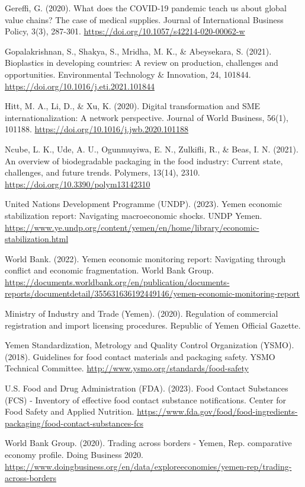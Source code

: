 \documentclass[12pt,a4paper]{article}
\begin{document}
Gereffi, G. (2020). What does the COVID-19 pandemic teach us about global value chains? The case of medical supplies. Journal of International Business Policy, 3(3), 287-301. \url{https://doi.org/10.1057/s42214-020-00062-w}

Gopalakrishnan, S., Shakya, S., Mridha, M. K., \& Abeysekara, S. (2021). Bioplastics in developing countries: A review on production, challenges and opportunities. Environmental Technology \& Innovation, 24, 101844. \url{https://doi.org/10.1016/j.eti.2021.101844}

Hitt, M. A., Li, D., \& Xu, K. (2020). Digital transformation and SME internationalization: A network perspective. Journal of World Business, 56(1), 101188. \url{https://doi.org/10.1016/j.jwb.2020.101188}

Ncube, L. K., Ude, A. U., Ogunmuyiwa, E. N., Zulkifli, R., \& Beas, I. N. (2021). An overview of biodegradable packaging in the food industry: Current state, challenges, and future trends. Polymers, 13(14), 2310. \url{https://doi.org/10.3390/polym13142310}

United Nations Development Programme (UNDP). (2023). Yemen economic stabilization report: Navigating macroeconomic shocks. UNDP Yemen. \url{https://www.ye.undp.org/content/yemen/en/home/library/economic-stabilization.html}

World Bank. (2022). Yemen economic monitoring report: Navigating through conflict and economic fragmentation. World Bank Group. \url{https://documents.worldbank.org/en/publication/documents-reports/documentdetail/355631636192449146/yemen-economic-monitoring-report}

Ministry of Industry and Trade (Yemen). (2020). Regulation of commercial registration and import licensing procedures. Republic of Yemen Official Gazette.

Yemen Standardization, Metrology and Quality Control Organization (YSMO). (2018). Guidelines for food contact materials and packaging safety. YSMO Technical Committee. \url{http://www.ysmo.org/standards/food-safety}

U.S. Food and Drug Administration (FDA). (2023). Food Contact Substances (FCS) - Inventory of effective food contact substance notifications. Center for Food Safety and Applied Nutrition. \url{https://www.fda.gov/food/food-ingredients-packaging/food-contact-substances-fcs}

World Bank Group. (2020). Trading across borders - Yemen, Rep. comparative economy profile. Doing Business 2020. \url{https://www.doingbusiness.org/en/data/exploreeconomies/yemen-rep/trading-across-borders}
\end{document}

